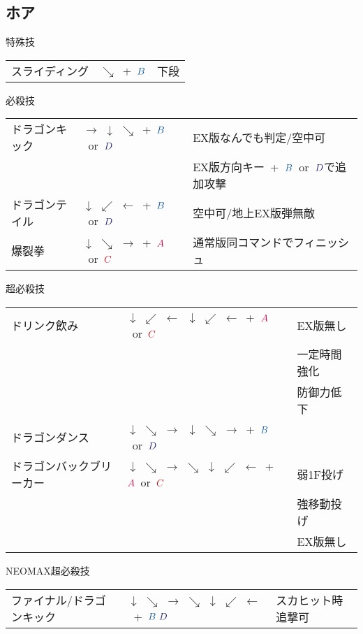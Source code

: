 \documentclass[a4j,11pt]{jarticle}
\def\A{\textcolor{Acolor}{A}}
\def\C{\textcolor{Ccolor}{C}}
\def\B{\textcolor{Bcolor}{B}}
\def\D{\textcolor{Dcolor}{D}}
\def\hado{$\downarrow$ $\searrow$ $\rightarrow$}%
\def\tatsu{$\downarrow$ $\swarrow$ $\leftarrow$}%
\def\syoryu{$\rightarrow$ $\downarrow$ $\searrow$}%
\def\ryuko{$\downarrow$ $\searrow$ $\rightarrow$ $\searrow$ $\downarrow$ $\swarrow$ $\leftarrow$}%
\begin{document}
\subsection{ホア}
\begin{itembox}[l]{特殊技}
\begin{tabular}{lll}
スライディング&$\searrow$\ +\ $\B$&下段%
\end{tabular}
\end{itembox}
\begin{itembox}[l]{必殺技}
\begin{tabular}{lll}
ドラゴンキック&\syoryu\ +\ $\B$\ or\ $\D$&EX版なんでも判定/空中可\\%
&&EX版方向キー\ +\ $\B$\ or\ $\D$で追加攻撃\\
ドラゴンテイル&\tatsu\ +\ $\B$\ or\ $\D$&空中可/地上EX版弾無敵\\%
爆裂拳&\hado\ +\ $\A$\ or\ $\C$&通常版同コマンドでフィニッシュ\\%
\end{tabular}
\end{itembox}
\begin{itembox}[l]{超必殺技}
\begin{tabular}{lll}
ドリンク飲み&\tatsu\ \tatsu\ +\ $\A$\ or\ $\C$&EX版無し\\
&&一定時間強化\\
&&防御力低下\\%
ドラゴンダンス&\hado\ \hado\ +\ $\B$\ or\ $\D$&\\%
ドラゴンバックブリーカー&\ryuko\ +\ $\A$\ or\ $\C$&弱1F投げ\\
&&強移動投げ\\%
&&EX版無し
\end{tabular}
\end{itembox}
\begin{itembox}[l]{NEOMAX超必殺技}
\begin{tabular}{lll}
ファイナル/ドラゴンキック&\ryuko\ +\ $\B\ \D$&スカヒット時追撃可%
\end{tabular}
\end{itembox}
\newpage
\end{document}
